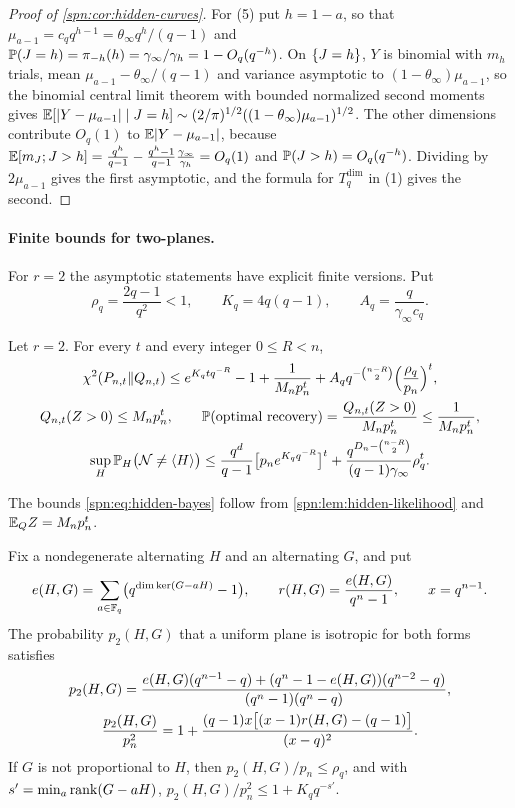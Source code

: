 \begin{proof}[Proof of \cref{spn:cor:hidden-curves}]
For (5) put $h=1-a$, so that $\mu_{a-1}=c_qq^{h-1}=\theta_\infty q^h/(q-1)$ and
$\mathbb{P}(J=h)=\pi_{-h}(h)=\gamma_\infty/\gamma_h=1-O_q(q^{-h})$. On $\{J=h\}$, $Y$ is binomial with
$m_h$ trials, mean $\mu_{a-1}-\theta_\infty/(q-1)$ and variance asymptotic to
$(1-\theta_\infty)\mu_{a-1}$, so the binomial central limit theorem with bounded normalized second
moments gives $\mathbb{E}[\lvert Y-\mu_{a-1}\rvert\mid J=h]\sim(2/\pi)^{1/2}((1-\theta_\infty)\mu_{a-1})^{1/2}$.
The other dimensions contribute $O_q(1)$ to $\mathbb{E}\lvert Y-\mu_{a-1}\rvert$, because
$\mathbb{E}[m_J;J>h]=\frac{q^h}{q-1}-\frac{q^h-1}{q-1}\frac{\gamma_\infty}{\gamma_h}=O_q(1)$ and
$\mathbb{P}(J>h)=O_q(q^{-h})$. Dividing by $2\mu_{a-1}$ gives the first asymptotic, and the formula for
$T^{\dim}_q$ in (1) gives the second.
\end{proof}

\paragraph{Finite bounds for two-planes.}
For $r=2$ the asymptotic statements have explicit finite versions. Put
\[
 \rho_q=\frac{2q-1}{q^2}<1,\qquad K_q=4q(q-1),\qquad A_q=\frac q{\gamma_\infty c_q}.
\]

\begin{proposition}\label{spn:prop:hidden-finite}
Let $r=2$. For every $t$ and every integer $0\le R<n$,
\begin{gather}
 \chi^2(P_{n,t}\Vert Q_{n,t})\le e^{K_qtq^{-R}}-1+\frac1{M_np_n^t}
 +A_qq^{-\binom{n-R}2}\Bigl(\frac{\rho_q}{p_n}\Bigr)^t,\label{spn:eq:hidden-chi}\\
 Q_{n,t}(Z>0)\le M_np_n^t,\qquad
 \mathbb{P}(\text{optimal recovery})=\frac{Q_{n,t}(Z>0)}{M_np_n^t}\le\frac1{M_np_n^t},
 \label{spn:eq:hidden-bayes}\\
 \sup_H\mathbb{P}_H\bigl(\mathcal N\ne\langle H\rangle\bigr)\le\frac{q^d}{q-1}\bigl[p_ne^{K_qq^{-R}}\bigr]^t
 +\frac{q^{D_n-\binom{n-R}2}}{(q-1)\gamma_\infty}\rho_q^t.\label{spn:eq:hidden-recovery}
\end{gather}
\end{proposition}

The bounds \eqref{spn:eq:hidden-bayes} follow from \cref{spn:lem:hidden-likelihood} and
$\mathbb{E}_QZ=M_np_n^t$.

\begin{lemma}\label{spn:lem:hidden-pair}
Fix a nondegenerate alternating $H$ and an alternating $G$, and put
\[
 e(H,G)=\sum_{a\in\mathbb{F}_q}\bigl(q^{\dim\ker(G-aH)}-1\bigr),\qquad r(H,G)=\frac{e(H,G)}{q^n-1},\qquad
 x=q^{n-1}.
\]
The probability $p_2(H,G)$ that a uniform plane is isotropic for both forms satisfies
\begin{gather}
 p_2(H,G)=\frac{e(H,G)(q^{n-1}-q)+(q^n-1-e(H,G))(q^{n-2}-q)}{(q^n-1)(q^n-q)},\notag\\
 \frac{p_2(H,G)}{p_n^2}=1+\frac{(q-1)x\bigl[(x-1)r(H,G)-(q-1)\bigr]}{(x-q)^2}.\label{spn:eq:hidden-explicit}
\end{gather}
If $G$ is not proportional to $H$, then $p_2(H,G)/p_n\le\rho_q$, and with
$s'=\min_a\operatorname{rank}(G-aH)$, $p_2(H,G)/p_n^2\le1+K_qq^{-s'}$.
\end{lemma}

